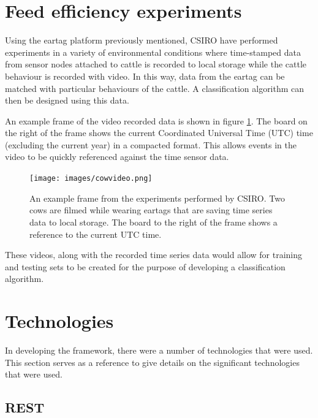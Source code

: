 \section{Feed efficiency experiments}
\label{feedef}
Using the eartag platform previously mentioned, CSIRO have performed experiments in a variety of environmental conditions where time-stamped data from sensor nodes attached to cattle is recorded to local storage while the cattle behaviour is recorded with video. In this way, data from the eartag can be matched with particular behaviours of the cattle. A classification algorithm can then be designed using this data.

An example frame of the video recorded data is shown in figure \ref{cowvideo}. The board on the right of the frame shows the current Coordinated Universal Time (UTC) time (excluding the current year) in a compacted format. This allows events in the video to be quickly referenced against the time sensor data.

\begin{figure}[ht!]
\begin{center}
\leavevmode
\texttt{[image: images/cowvideo.png]}
\end{center}
\caption[Frame of cattle video]{An example frame from the experiments performed by CSIRO. Two cows are filmed while wearing eartags that are saving time series data to local storage. The board to the right of the frame shows a reference to the current UTC time.}
\label{cowvideo}
\end{figure}

These videos, along with the recorded time series data would allow for training and testing sets to be created for the purpose of developing a classification algorithm.

\section{Technologies}

In developing the framework, there were a number of technologies that were used. This section serves as a reference to give details on the significant technologies that were used. 

\subsection{REST}


